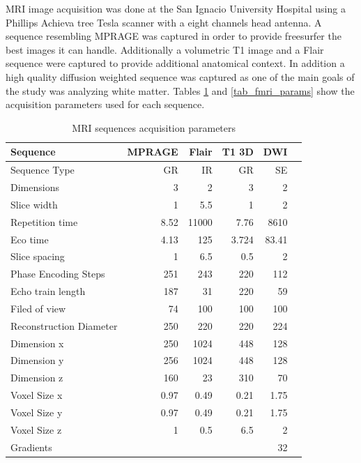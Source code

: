MRI image acquisition was done at the San Ignacio University Hospital using a Phillips Achieva tree Tesla scanner with a eight channels head  antenna. A sequence resembling MPRAGE was captured in order to provide freesurfer the best images it can handle. Additionally a volumetric T1 image and a Flair sequence were captured to provide additional anatomical context. In addition a high quality diffusion weighted sequence was captured as one of the main goals of the study was analyzing white matter. Tables \ref{tab_mri_params} and \ref{tab_fmri_params} show the acquisition parameters used for each sequence. 
\begin{table}
	\centering
	\footnotesize
		\begin{tabular}{lrrrrr}
				\toprule
				Sequence&MPRAGE	&Flair	&T1 3D &DWI\\ 
				\midrule
				Sequence Type	&GR	&IR	&GR &SE\\ 
				Dimensions	&3	&2	&3 &2\\
				Slice width	&1	&5.5	&1 &2\\
				Repetition time	&8.52	&11000	&7.76 &8610\\
				Eco time	&4.13	&125	&3.724 &83.41\\
				Slice spacing	&1	&6.5	&0.5 &2\\
				Phase Encoding Steps	&251	&243	&220 &112\\
				Echo train length	&187	&31	&220 &59\\
				Filed of view	&74	&100	&100 &100\\
				Reconstruction	Diameter&250	&220	&220 &224\\ \addlinespace
				Dimension x &250	&1024 &448  &128 \\
				Dimension y &256	&1024 &448 &128 \\
				Dimension z &160	&23 &310 &70 \\ \addlinespace
				Voxel Size x	&0.97 &0.49 &0.21  &1.75 \\
				Voxel Size y	&0.97 &0.49 &0.21 &1.75 \\
				Voxel Size z	&1  &0.5 &6.5 &2 \\ \addlinespace
				Gradients   &    &    &    &    32 \\
				\bottomrule
		\end{tabular}
	\caption{MRI sequences acquisition parameters}
	\label{tab_mri_params}
\end{table}


